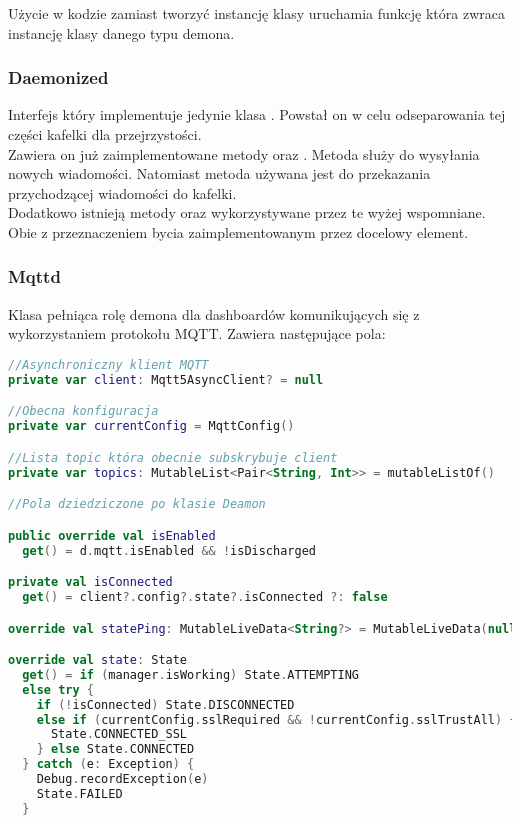 Użycie w kodzie  zamiast tworzyć instancję klasy  uruchamia funkcję  która zwraca instancję klasy danego typu demona.

\subsubsection{Daemonized}
Interfejs który implementuje jedynie klasa . Powstał on w celu odseparowania tej części kafelki dla przejrzystości.\\

Zawiera on już zaimplementowane metody  oraz . Metoda  służy do wysyłania nowych wiadomości. Natomiast metoda  używana jest do przekazania przychodzącej wiadomości do kafelki.\\

Dodatkowo istnieją metody  oraz  wykorzystywane przez te wyżej wspomniane. Obie z przeznaczeniem bycia zaimplementowanym przez docelowy element.

\newpage

\subsubsection{Mqttd}
Klasa pełniąca rolę demona dla dashboardów komunikujących się z wykorzystaniem protokołu MQTT. Zawiera następujące pola:

\begin{lstlisting}[language=Kotlin]
//Asynchroniczny klient MQTT
private var client: Mqtt5AsyncClient? = null

//Obecna konfiguracja
private var currentConfig = MqttConfig()

//Lista topic która obecnie subskrybuje client
private var topics: MutableList<Pair<String, Int>> = mutableListOf()

//Pola dziedziczone po klasie Deamon

public override val isEnabled
  get() = d.mqtt.isEnabled && !isDischarged

private val isConnected
  get() = client?.config?.state?.isConnected ?: false

override val statePing: MutableLiveData<String?> = MutableLiveData(null)

override val state: State
  get() = if (manager.isWorking) State.ATTEMPTING
  else try {
    if (!isConnected) State.DISCONNECTED
    else if (currentConfig.sslRequired && !currentConfig.sslTrustAll) {
      State.CONNECTED_SSL
    } else State.CONNECTED
  } catch (e: Exception) {
    Debug.recordException(e)
    State.FAILED
  }
\end{lstlisting}

